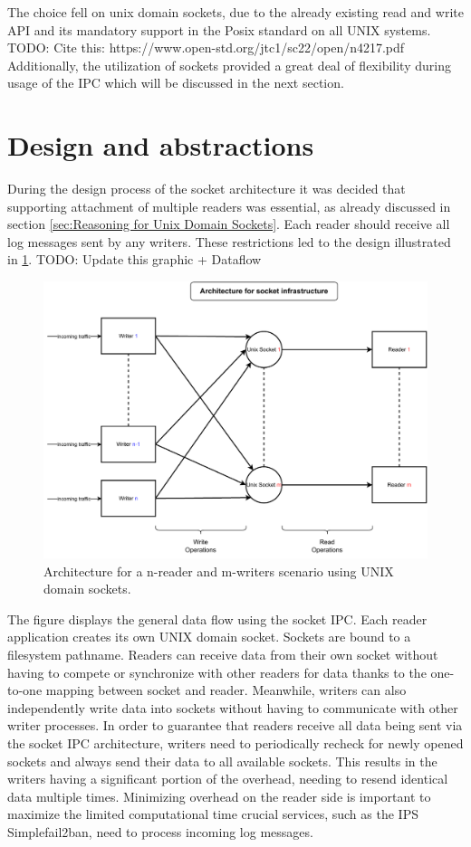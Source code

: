 The choice fell on unix domain sockets, due to the already existing read and write API and its mandatory support in the Posix standard on all UNIX systems. TODO: Cite this: https://www.open-std.org/jtc1/sc22/open/n4217.pdf
Additionally, the utilization of sockets provided a great deal of flexibility during usage of the IPC which will be discussed in the next section.

\section{Design and abstractions}
During the design process of the socket architecture it was decided that supporting attachment of multiple readers was essential, as already discussed in section \ref{sec:Reasoning for Unix Domain Sockets}.
Each reader should receive all log messages sent by any writers.
These restrictions led to the design illustrated in \ref{fig:socket:architecture}. TODO: Update this graphic + Dataflow

\begin{figure}[h!]
    \centerline{\includegraphics[width=1.2\textwidth]{images/SocketArchitecture.pdf}}
    \caption[General design of socket architecture]{
        Architecture for a n-reader and m-writers scenario using UNIX domain sockets.}
	\label{fig:socket:architecture}
\end{figure}

The figure displays the general data flow using the socket IPC.
Each reader application creates its own UNIX domain socket.
Sockets are bound to a filesystem pathname.
Readers can receive data from their own socket without having to compete or synchronize with other readers for data thanks to the one-to-one mapping between socket and reader.
Meanwhile, writers can also independently write data into sockets without having to communicate with other writer processes.
In order to guarantee that readers receive all data being sent via the socket IPC architecture, writers need to periodically recheck for newly opened sockets and always send their data to all available sockets.
This results in the writers having a significant portion of the overhead, needing to resend identical data multiple times.
Minimizing overhead on the reader side is important to maximize the limited computational time crucial services, such as the IPS Simplefail2ban, need to process incoming log messages.

